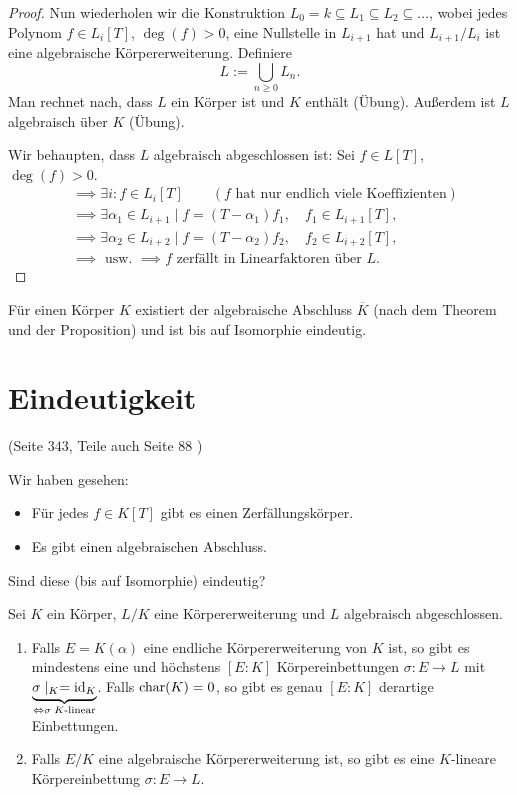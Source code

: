 \begin{proof}
		Nun wiederholen wir die Konstruktion $L_0 = k \subseteq L_1 \subseteq L_2 \subseteq \ldots$, wobei jedes Polynom $f \in L_{i}[T]$,
		$\deg(f) > 0$, eine Nullstelle in $L_{i+1}$ hat und $L_{i+1} / L_{i}$ ist eine algebraische Körpererweiterung.
		Definiere
		\[
		L := \bigcup_{n \geq 0}  L_{n}
		.\] 
		Man rechnet nach, dass $L$ ein Körper ist und $K$ enthält (Übung).
		Außerdem ist $L$ algebraisch über $K$ (Übung).

		Wir behaupten, dass $L$ algebraisch abgeschlossen ist: Sei $f \in L[T]$, $\deg(f) > 0$.
		\begin{align*}
			&\implies \exists i : f \in L_{i}[T] \qquad (f \text{ hat nur endlich viele Koeffizienten})\\
			&\implies \exists \alpha_1 \in L_{i+1} \mid f = (T-\alpha_1) f_1, \quad f_1 \in L_{i+1}[T],\\
			&\implies \exists \alpha_2 \in L_{i+2} \mid f = (T-\alpha_2) f_2, \quad f_2 \in L_{i+2}[T],\\
			&\implies \text{ usw. } \implies f \text{ zerfällt in Linearfaktoren über } L.
		\end{align*}
\end{proof}

\begin{remark}
	Für einen Körper $K$ existiert der algebraische Abschluss $\overline{K}$ (nach dem Theorem und der Proposition) und ist bis auf Isomorphie eindeutig.
\end{remark}

\section{Eindeutigkeit}
(Seite $343$, Teile auch Seite $88$ )

Wir haben gesehen: 
\begin{itemize}
	\item Für jedes $f \in K[T]$ gibt es einen Zerfällungskörper.
	\item Es gibt einen algebraischen Abschluss.
\end{itemize}
Sind diese (bis auf Isomorphie) eindeutig?

\begin{theorem}
	Sei $K$ ein Körper, $L / K$ eine Körpererweiterung und $L$ algebraisch abgeschlossen.
	\begin{enumerate}
		\item Falls $E = K(\alpha)$ eine endliche Körpererweiterung von $K$ ist, so gibt es mindestens eine
			und höchstens $[E:K]$ Körpereinbettungen $\sigma: E \to L$ mit $\underbrace{\sigma \mid_{K} = \operatorname{id}_{K}}_{\Leftrightarrow \sigma \; K\text{-linear}}$.
			Falls $\operatorname{char}(K)=0$, so gibt es genau $[E:K]$ derartige Einbettungen.
		\item Falls $E / K$ eine algebraische Körpererweiterung ist, so gibt es eine $K$-lineare Körpereinbettung
			$\sigma: E \to L$.
	\end{enumerate}
\end{theorem}

